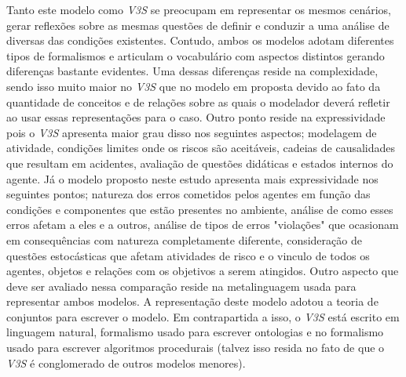 Tanto este modelo como \textit{V3S} se preocupam em representar os mesmos cenários, gerar reflexões sobre as mesmas questões de definir e conduzir a uma análise de diversas das condições existentes. Contudo, ambos os modelos adotam diferentes tipos de formalismos e articulam o vocabulário com aspectos distintos gerando diferenças bastante evidentes. Uma dessas diferenças reside na complexidade, sendo isso muito maior no \textit{V3S} que no modelo em proposta devido ao fato da quantidade de conceitos e de relações sobre as quais o modelador deverá refletir ao usar essas representações para o caso. Outro ponto reside na expressividade pois o \textit{V3S} apresenta maior grau disso nos seguintes aspectos; modelagem de atividade, condições limites onde os riscos são aceitáveis, cadeias de causalidades que resultam em acidentes, avaliação de questões didáticas e estados internos do agente. Já o modelo proposto neste estudo apresenta mais expressividade nos seguintes pontos; natureza dos erros cometidos pelos agentes em função das condições e componentes que estão presentes no ambiente, análise de como esses erros afetam a eles e a outros, análise de tipos de erros "violações" que ocasionam em consequências com natureza completamente diferente, consideração de questões estocásticas que afetam atividades de risco e o vinculo de todos os agentes, objetos e relações com os objetivos a serem atingidos. Outro aspecto que deve ser avaliado nessa comparação reside na metalinguagem usada para representar ambos modelos. A representação deste modelo adotou a teoria de conjuntos para escrever o modelo. Em contrapartida a isso, o \textit{V3S} está escrito em linguagem natural, formalismo usado para escrever ontologias e no formalismo usado para escrever algoritmos procedurais (talvez isso resida no fato de que o \textit{V3S} é conglomerado de outros modelos menores).